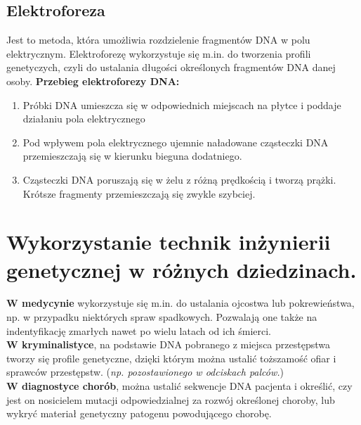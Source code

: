 \documentclass[a4paper, twocolumn]{article}
\begin{document}
\subsection{Elektroforeza}%
\label{sub:Elektroforeza}
Jest to metoda, która umożliwia rozdzielenie fragmentów DNA w polu elektrycznym.
Elektroforezę wykorzystuje się m.in. do tworzenia profili genetyczych, czyli do ustalania długości określonych fragmentów DNA danej osoby.  \textbf{Przebieg elektroforezy DNA:} \begin{enumerate}
	\item Próbki DNA umieszcza się w odpowiednich miejscach na płytce i poddaje działaniu pola elektrycznego
	\item Pod wpływem pola elektrycznego ujemnie naładowane cząsteczki DNA przemieszczają się w kierunku bieguna dodatniego.
	\item Cząsteczki DNA poruszają się w żelu z różną prędkością i tworzą prążki. Krótsze fragmenty przemieszczają się zwykle szybciej.
\end{enumerate}
\section{Wykorzystanie technik inżynierii genetycznej w różnych dziedzinach.}%
\label{sec:Wykorzystanie technik inżynierii genetycznej w różnych dziedzinach.}
\textbf{W medycynie} wykorzystuje się m.in. do ustalania ojcostwa lub pokrewieństwa, np. w przypadku niektórych spraw spadkowych.
Pozwalają one także na indentyfikację zmarłych nawet po wielu latach od ich śmierci. \\
\textbf{W kryminalistyce}, na podstawie DNA pobranego z miejsca przestępstwa tworzy się profile genetyczne, dzięki którym można ustalić toższamość ofiar i sprawców przestępstw. (\textit{np. pozostawionego w odciskach palców.}) \\
\textbf{W diagnostyce chorób}, można ustalić sekwencje DNA pacjenta i określić, czy jest on nosicielem mutacji odpowiedzialnej za rozwój określonej choroby, lub wykryć materiał genetyczny patogenu powodującego chorobę.
\end{document}
